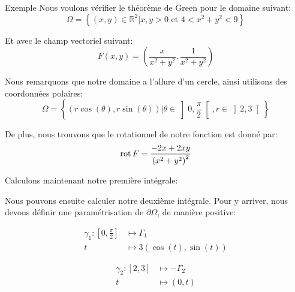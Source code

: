 \documentclass[a4paper]{article}
\begin{document}
\begin{parag}{Exemple}
    Nous voulons vérifier le théorème de Green pour le domaine suivant: 
    \[\Omega = \left\{\left(x, y\right) \in \mathbb{R}^2 | x, y > 0 \text{ et } 4 < x^2 + y^2 < 9\right\}\]
    
    Et avec le champ vectoriel suivant: 
    \[F\left(x, y\right) = \left(\frac{x}{x^2 + y^2}, \frac{1}{x^2 + y^2}\right)\]
    
    Nous remarquons que notre domaine a l'allure d'un cercle, ainsi utilisons des coordonnées polaires: 
    \[\Omega = \left\{\left(r\cos\left(\theta\right), r\sin\left(\theta\right)\right) | \theta \in \left]0, \frac{\pi}{2}\right[ , r \in \left]2, 3\right[ \right\}\]

    De plus, nous trouvons que le rotationnel de notre fonction est donné par: 
    \[\rot F = \frac{-2x + 2xy}{\left(x^2 + y^2\right)^2}\]
    
    Calculons maintenant notre première intégrale:
    
    Nous pouvons ensuite calculer notre deuxième intégrale. Pour y arriver, nous devons définir une paramétrisation de $\partial \Omega$, de manière positive:
    \begin{center}
    \begin{minipage}{0.45\textwidth}
    \[\begin{split}
    \gamma_1: \left[0, \frac{\pi}{2}\right] &\longmapsto \Gamma_1 \\
    t &\longmapsto 3\left(\cos\left(t\right), \sin\left(t\right)\right)
    \end{split}\]
    \end{minipage}
    \hfill
    \begin{minipage}{0.45\textwidth}
    \[\begin{split}
    \gamma_2: \left[2, 3\right] &\longmapsto -\Gamma_2 \\
    t &\longmapsto \left(0, t\right)
    \end{split}\]
    \end{minipage}
    \end{center}
    

\end{parag}
\end{document}
